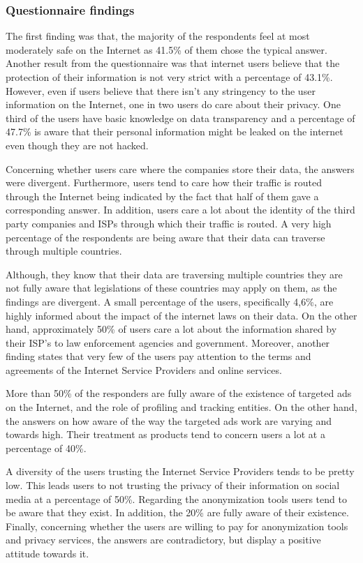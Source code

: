\subsubsection{Questionnaire findings}

The first finding was that, the majority  of the respondents feel at most 
moderately safe on the Internet as 41.5\% of them chose the typical answer. 
Another result from the questionnaire was that internet users believe that the 
protection of their information is not very strict with a percentage of 43.1\%. 
However, even if users believe that there isn't any stringency to the user 
information on the Internet, one in two users do care about their privacy. 
One third of the users have basic knowledge on data transparency and a 
percentage of 47.7\% is aware that their personal information might be leaked on 
the internet even though they are not hacked. 

Concerning whether users care where the companies store their data, the answers 
were divergent. Furthermore, users  tend to care how their traffic is routed 
through the Internet being indicated by the fact that half of them gave a 
corresponding answer. In addition, users care a lot about the identity of the 
third party companies and ISPs through which their traffic is routed. 
A very high percentage of the respondents are being aware that their data can 
traverse through multiple countries. 

Although, they know that their data are traversing multiple countries they are 
not fully aware that legislations of these countries may apply on them, as the 
findings are divergent. A small percentage of the users, specifically 4,6\%, are 
highly informed about the impact of the internet laws on their data. 
On the other hand, approximately 50\% of users care a lot about  the information 
shared by their ISP's to law enforcement agencies and government. Moreover, 
another finding states that very few of the users pay attention to the terms and 
agreements of the Internet Service Providers and online services.

More than 50\% of the responders are fully aware of the existence of targeted 
ads on the Internet, and the role of profiling and tracking entities. On the 
other hand, the answers on how aware of the way the targeted ads work are 
varying and towards high. Their treatment as products tend to concern users a 
lot at a percentage of 40\%. 

A diversity of the users trusting the Internet Service Providers tends to be 
pretty low. This leads users to not trusting the privacy of their information on 
social media at a percentage of 50\%. Regarding the anonymization tools users 
tend to be aware that they exist. In addition, the 20\% are fully aware of their 
existence. Finally, concerning whether the users are willing to pay for 
anonymization tools and privacy services, the answers are contradictory, but 
display a positive attitude towards it.

